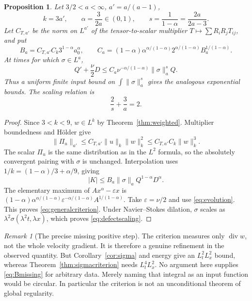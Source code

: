 \documentclass[11pt,a4paper]{article}
\newtheorem{proposition}[theorem]{Proposition}
\theoremstyle{definition}
\theoremstyle{remark}
\newtheorem{remark}[theorem]{Remark}
\newcommand{\norm}[1]{\lVert #1\rVert}
\newcommand{\diver}{\operatorname{div}}
\numberwithin{equation}{section}
\begin{document}
\begin{proposition}\label{prop:generalcriterion}
Let \(3/2<a<\infty\), \(a'=a/(a-1)\),
\[
k=3a',\qquad \alpha=\frac{3}{2a}\in(0,1),
\qquad s=\frac1{1-\alpha}=\frac{2a}{2a-3}.
\]
Let \(C_{T,a'}\) be the norm on \(L^{a'}\) of the tensor-to-scalar multiplier \(T\mapsto\sum R_iR_jT_{ij}\), and put
\[
B_a=C_{T,a'}C_k3^{1-\alpha}a_0^\alpha,
\qquad
C_a=(1-\alpha)\alpha^{\alpha/(1-\alpha)}2^{\alpha/(1-\alpha)}B_a^{1/(1-\alpha)}.
\]
At times for which \(\sigma\in L^a\),
\begin{equation}\label{eq:generalcriterion}
Q'+\frac\nu2D
\le C_a\nu^{-\alpha/(1-\alpha)}\norm\sigma_a^s Q.
\end{equation}
Thus a uniform finite input bound on \(\int\norm\sigma_a^s\) gives the analogous exponential bounds. The scaling relation is
\begin{equation}\label{eq:defectscaling}
\frac2s+\frac3a=2.
\end{equation}
\end{proposition}
\begin{proof}
Since \(3<k<9\), \(w\in L^k\) by Theorem~\ref{thm:weighted}. Multiplier boundedness and Hölder give
\[
\norm{\Pi_u}_{a'}\le C_{T,a'}\norm u_k\norm w_k^2
\le C_{T,a'}C_k\norm w_k^3.
\]
The scalar \(\Pi_u\) is the same distribution as in the \(L^2\) formula, so the absolutely convergent pairing with \(\sigma\) is unchanged. Interpolation uses
\(1/k=(1-\alpha)/3+\alpha/9\), giving
\[
|K|\le B_a\norm\sigma_a Q^{1-\alpha}D^\alpha.
\]
The elementary maximum of \(Ax^\alpha-\varepsilon x\) is
\((1-\alpha)\alpha^{\alpha/(1-\alpha)}\varepsilon^{-\alpha/(1-\alpha)}A^{1/(1-\alpha)}\).
Take \(\varepsilon=\nu/2\) and use \eqref{eq:evolution}. This proves \eqref{eq:generalcriterion}. Under Navier--Stokes dilation, \(\sigma\) scales as \(\lambda^2\sigma(\lambda^2t,\lambda x)\), which proves \eqref{eq:defectscaling}.
\end{proof}

\begin{remark}[The precise missing positive step]
The criterion measures only \(\diver w\), not the whole velocity gradient. It is therefore a genuine refinement in the observed quantity. But Corollary~\ref{cor:sigma} and energy give an \(L^2_tL^2_x\) bound, whereas Theorem~\ref{thm:sigmacriterion} needs \(L^4_tL^2_x\). No argument here supplies \eqref{eq:Bmissing} for arbitrary data. Merely naming that integral as an input function would be circular. In particular the criterion is not an unconditional theorem of global regularity.
\end{remark}
\end{document}
